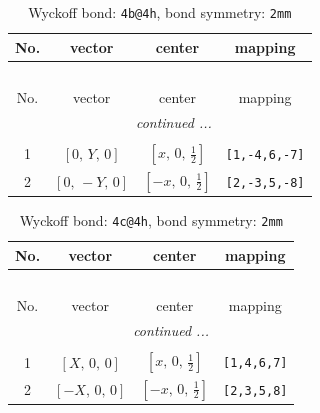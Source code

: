 \documentclass[fleqn,8pt]{jsarticle}
\begin{document}
\renewcommand{\arraystretch}{1.2}
\begin{longtable}{cccc}
\caption{Wyckoff bond: {\tt 4b@4h}, bond symmetry: {\tt 2mm}}
 \\
 \hline \hline
No. & vector & center & mapping \\ \hline \endfirsthead

\multicolumn{3}{l}{\tablename\ \thetable{}} \\
 \hline \hline
No. & vector & center & mapping \\ \hline \endhead

 \hline \hline
\multicolumn{3}{r}{\footnotesize\it continued ...} \\ \endfoot

 \hline \hline
\multicolumn{3}{r}{} \\ \endlastfoot

1 & $\left[ 0,\, Y,\, 0 \right]$ & $\left[ x,\, 0,\, \frac{1}{2} \right]$ & {\tt [1,-4,6,-7]} \\ \hline
2 & $\left[ 0,\, - Y,\, 0 \right]$ & $\left[ - x,\, 0,\, \frac{1}{2} \right]$ & {\tt [2,-3,5,-8]} \\
\end{longtable}
\renewcommand{\arraystretch}{1.2}
\begin{longtable}{cccc}
\caption{Wyckoff bond: {\tt 4c@4h}, bond symmetry: {\tt 2mm}}
 \\
 \hline \hline
No. & vector & center & mapping \\ \hline \endfirsthead

\multicolumn{3}{l}{\tablename\ \thetable{}} \\
 \hline \hline
No. & vector & center & mapping \\ \hline \endhead

 \hline \hline
\multicolumn{3}{r}{\footnotesize\it continued ...} \\ \endfoot

 \hline \hline
\multicolumn{3}{r}{} \\ \endlastfoot

1 & $\left[ X,\, 0,\, 0 \right]$ & $\left[ x,\, 0,\, \frac{1}{2} \right]$ & {\tt [1,4,6,7]} \\ \hline
2 & $\left[ - X,\, 0,\, 0 \right]$ & $\left[ - x,\, 0,\, \frac{1}{2} \right]$ & {\tt [2,3,5,8]} \\
\end{longtable}
\renewcommand{\arraystretch}{1.2}
\end{document}
